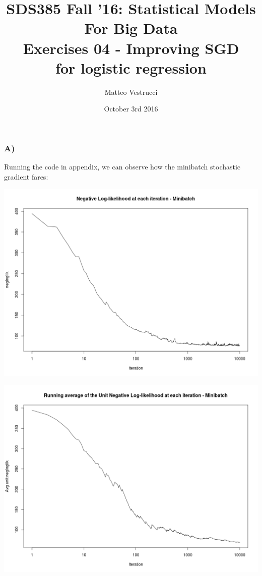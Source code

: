 \documentclass{article}
\title{SDS385 Fall '16: Statistical Models For Big Data\\Exercises 04 - Improving SGD\\for logistic regression}
\author{Matteo Vestrucci}
\date{October 3rd 2016}
\begin{document}
\maketitle
\bigskip\bigskip\bigskip

\subsubsection*{A)}

Running the code in appendix, we can observe how the minibatch stochastic gradient fares:

\includegraphics[width=\textwidth]{Rplot_minibatch01.png}

\includegraphics[width=\textwidth]{Rplot_minibatch02.png}
\end{document}
